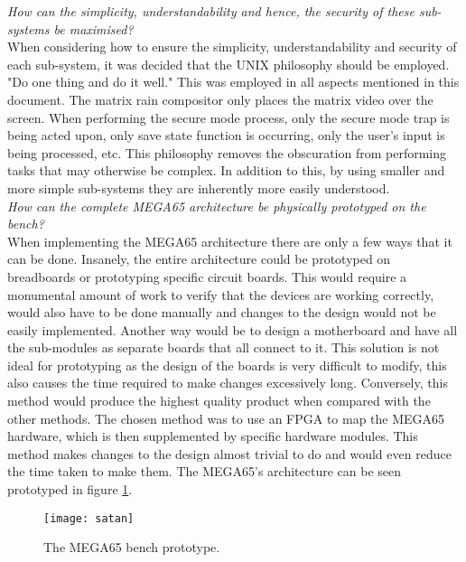 \textit{How can the simplicity, understandability and hence, the security of these sub-systems be maximised?}\\
When considering how to ensure the simplicity, understandability and security of each sub-system, it was decided that the UNIX philosophy should be employed. "Do one thing and do it well." This was employed in all aspects mentioned in this document. The matrix rain compositor only places the matrix video over the screen. When performing the secure mode process, only the secure mode trap is being acted upon, only save state function is occurring, only the user's input is being processed, etc. This philosophy removes the obscuration from performing tasks that may otherwise be complex. In addition to this, by using smaller and more simple sub-systems they are inherently more easily understood. 
\\
\textit{How can the complete MEGA65 architecture be physically prototyped on the bench?}\\
When implementing the MEGA65 architecture there are only a few ways that it can be done. Insanely, the entire architecture could be prototyped on breadboards or prototyping specific circuit boards. This would require a monumental amount of work to verify that the devices are working correctly, would also have to be done manually and changes to the design would not be easily implemented. Another way would be to design a motherboard and have all the sub-modules as separate boards that all connect to it. This solution is not ideal for prototyping as the design of the boards is very difficult to modify, this also causes the time required to make changes excessively long. Conversely, this method would produce the highest quality product when compared with the other methods. The chosen method was to use an FPGA to map the MEGA65 hardware, which is then supplemented by specific hardware modules. This method makes changes to the design almost trivial to do and would even reduce the time taken to make them. The MEGA65's architecture can be seen prototyped in figure \ref{fig:satan}.

\begin{figure}
  \centering
  \texttt{[image: satan]}
  \caption{The MEGA65 bench prototype.}
  \label{fig:satan}
\end{figure}

